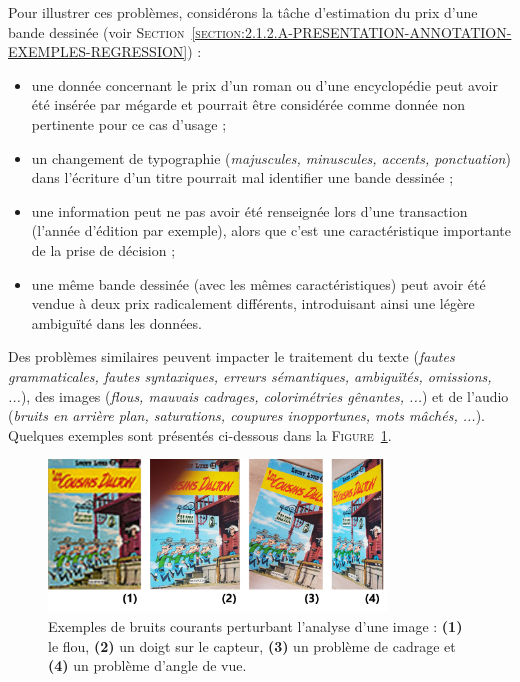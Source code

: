 			\begin{leftBarExamples}
				Pour illustrer ces problèmes, considérons la tâche d'estimation du prix d'une bande dessinée (voir \textsc{Section~\ref{section:2.1.2.A-PRESENTATION-ANNOTATION-EXEMPLES-REGRESSION}}) :
				\begin{itemize}
					\item une donnée concernant le prix d'un roman ou d'une encyclopédie peut avoir été insérée par mégarde et pourrait être considérée comme donnée non pertinente pour ce cas d'usage ;
					\item un changement de typographie (\textit{majuscules, minuscules, accents, ponctuation}) dans l'écriture d'un titre pourrait mal identifier une bande dessinée ;
					\item une information peut ne pas avoir été renseignée lors d'une transaction (l'année d'édition par exemple), alors que c'est une caractéristique importante de la prise de décision ;
					\item une même bande dessinée (avec les mêmes caractéristiques) peut avoir été vendue à deux prix radicalement différents, introduisant ainsi une légère ambiguïté dans les données.
				\end{itemize}
				
				Des problèmes similaires peuvent impacter le traitement du texte (\textit{fautes grammaticales, fautes syntaxiques, erreurs sémantiques, ambiguïtés, omissions, ...}), des images (\textit{flous, mauvais cadrages, colorimétries gênantes, ...}) et de l'audio (\textit{bruits en arrière plan, saturations, coupures inopportunes, mots mâchés, ...}).
				Quelques exemples sont présentés ci-dessous dans la \textsc{Figure~\ref{figure:2.3.1.B-DEFIS-ANNOTATION-ASPECT-DONNEES-BRUITS}}.
				\begin{figure}[H]
					\centering
					\includegraphics[width=0.80\textwidth]{figures/etatdelart-morris-1958-lucky-luke-12-bruits}
					\caption{
						Exemples de bruits courants perturbant l'analyse d'une image :
						\textbf{(1)} le flou,
						\textbf{(2)} un doigt sur le capteur,
						\textbf{(3)} un problème de cadrage
						et \textbf{(4)} un problème d'angle de vue.
					}
					\label{figure:2.3.1.B-DEFIS-ANNOTATION-ASPECT-DONNEES-BRUITS}
				\end{figure}
			\end{leftBarExamples}
			
